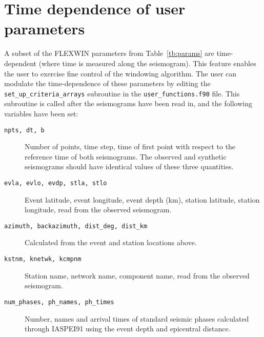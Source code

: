 \section{Time dependence of user parameters}
A subset of the FLEXWIN parameters from Table~\ref{tb:params} are time-dependent (where time is measured along the seismogram).  This feature enables the user to exercise fine control of the windowing algorithm.  The user can modulate the time-dependence of these parameters by editing the {\tt set\_up\_criteria\_arrays} subroutine in the {\tt user\_functions.f90} file.  This subroutine is called after the seismograms have been read in, and the following variables have been set: 
\begin{description}
\item[{\tt npts, dt, b}]  Number of points, time step, time of first point with respect to the reference time of both seismograms.  The observed and synthetic seismograms should have identical values of these three quantities.
\item[{\tt evla, evlo, evdp, stla, stlo}] Event latitude, event longitude, event depth (km), station latitude, station longitude, read from the observed seismogram.
\item[{\tt azimuth, backazimuth, dist\_deg, dist\_km}]  Calculated from the event and station locations above.
\item[{\tt kstnm, knetwk, kcmpnm}] Station name, network name, component name, read from the observed seismogram.
\item[{\tt num\_phases, ph\_names, ph\_times}] Number, names and arrival times of standard seismic phases calculated through IASPEI91 using the event depth and epicentral distance.
\end{description}

